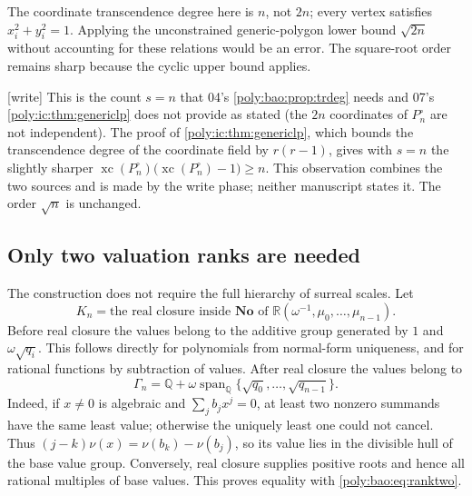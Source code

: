 \documentclass[11pt,a4paper]{article}
\numberwithin{equation}{section}
\theoremstyle{plain}
\newcommand{\wtag}{\textup{[write]}}%
\newcommand{\No}{\mathbf{No}}
\newcommand{\R}{\mathbb R}
\newcommand{\Q}{\mathbb Q}
\newcommand{\xc}{\operatorname{xc}}
\begin{document}
\begin{remark}\label{poly:bao:rem:circlecount}
The coordinate transcendence degree here is $n$, not $2n$; every vertex
satisfies $x_i^2+y_i^2=1$. Applying the unconstrained generic-polygon lower
bound $\sqrt{2n}$ without accounting for these relations would be an error.
The square-root order remains sharp because the cyclic upper bound applies.
\end{remark}

\begin{remark}\label{poly:bao:rem:sharpcount}
\wtag{} This is the count $s=n$ that 04's \cref{poly:bao:prop:trdeg} needs
and 07's \cref{poly:ic:thm:genericlp} does not provide as stated (the $2n$
coordinates of $P^\circ_n$ are not independent). The proof of
\cref{poly:ic:thm:genericlp}, which bounds the transcendence degree of the
coordinate field by $r(r-1)$, gives with $s=n$ the slightly sharper
$\xc(P^\circ_n)\bigl(\xc(P^\circ_n)-1\bigr)\geq n$. This observation
combines the two sources and is made by the write phase; neither
manuscript states it. The order $\sqrt n$ is unchanged.
\end{remark}

\subsection{Only two valuation ranks are needed}
The construction does not require the full hierarchy of surreal scales.
Let
\[
 K_n=\text{the real closure inside }\No\text{ of }
 \R(\omega^{-1},\mu_0,\ldots,\mu_{n-1}).
\]
Before real closure the values belong to the additive group generated by
$1$ and $\omega\sqrt{q_i}$. This follows directly for polynomials from
normal-form uniqueness, and for rational functions by subtraction of
values. After real closure the values belong to
\begin{equation}\label{poly:bao:eq:ranktwo}
 \Gamma_n=\Q+\omega\operatorname{span}_{\Q}
 \{\sqrt{q_0},\ldots,\sqrt{q_{n-1}}\}.
\end{equation}
Indeed, if $x\neq0$ is algebraic and $\sum_j b_jx^j=0$, at least two
nonzero summands have the same least value; otherwise the uniquely least
one could not cancel. Thus
$(j-k)\nu(x)=\nu(b_k)-\nu(b_j)$, so its value lies in the divisible hull
of the base value group. Conversely, real closure supplies positive roots
and hence all rational multiples of base values. This proves equality
with \eqref{poly:bao:eq:ranktwo}.
\end{document}
